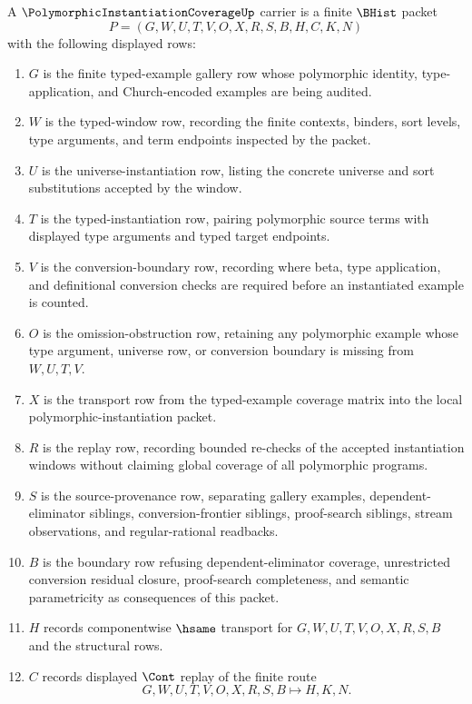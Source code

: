 \begin{definition}
\label{def:polymorphic-instantiation-coverage-carrier}
A $\PolymorphicInstantiationCoverageUp$ carrier is a finite $\BHist$ packet
$$
P=(G,W,U,T,V,O,X,R,S,B,H,C,K,N)
$$
with the following displayed rows:
\begin{enumerate}
\item $G$ is the finite typed-example gallery row whose polymorphic identity, type-application, and Church-encoded examples are being audited.
\item $W$ is the typed-window row, recording the finite contexts, binders, sort levels, type arguments, and term endpoints inspected by the packet.
\item $U$ is the universe-instantiation row, listing the concrete universe and sort substitutions accepted by the window.
\item $T$ is the typed-instantiation row, pairing polymorphic source terms with displayed type arguments and typed target endpoints.
\item $V$ is the conversion-boundary row, recording where beta, type application, and definitional conversion checks are required before an instantiated example is counted.
\item $O$ is the omission-obstruction row, retaining any polymorphic example whose type argument, universe row, or conversion boundary is missing from $W,U,T,V$.
\item $X$ is the transport row from the typed-example coverage matrix into the local polymorphic-instantiation packet.
\item $R$ is the replay row, recording bounded re-checks of the accepted instantiation windows without claiming global coverage of all polymorphic programs.
\item $S$ is the source-provenance row, separating gallery examples, dependent-eliminator siblings, conversion-frontier siblings, proof-search siblings, stream observations, and regular-rational readbacks.
\item $B$ is the boundary row refusing dependent-eliminator coverage, unrestricted conversion residual closure, proof-search completeness, and semantic parametricity as consequences of this packet.
\item $H$ records componentwise $\hsame$ transport for $G,W,U,T,V,O,X,R,S,B$ and the structural rows.
\item $C$ records displayed $\Cont$ replay of the finite route
$$
G,W,U,T,V,O,X,R,S,B \longmapsto H,K,N .
$$
\end{enumerate}
\end{definition}
